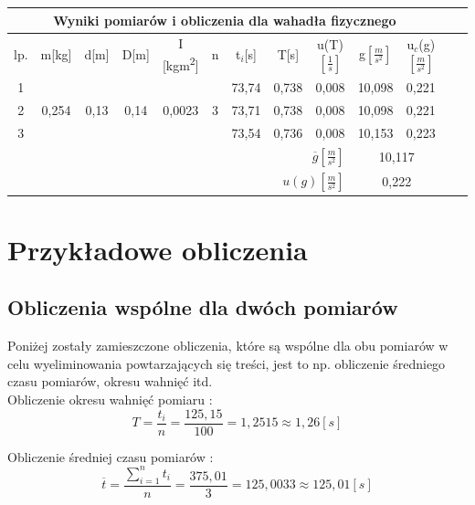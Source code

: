 \documentclass[12pt]{article}
\begin{document}
\begin{table}[!htbp]
    \centering
    \begin{adjustbox}{width=1\textwidth}
    \begin{tabular}{|c|c|c|c|c|c|c|c|c|c|c|c|c|}
    \hline
    \multicolumn{11}{|c|}{Wyniki pomiarów i obliczenia dla wahadła fizycznego} \\
    \hline
    lp. & m[kg] & d[m] & D[m] & I [kgm\textsuperscript{2}] & n & t$_i$[s] & T[s] & u(T)$\left[\frac{1}{s} \right]$ & g$\left[\frac{m}{s^2}\right]$ & u$_c$(g)$\left[ \frac{m}{s^2} \right]$ \\
    \hline
    1 & \multirow{3}{*}{0,254} & \multirow{3}{*}{0,13} & \multirow{3}{*}{0,14} & \multirow{3}{*}{0,0023} & \multirow{3}{*}{3} & 73,74 & 0,738 & 0,008 & 10,098 & 0,221 \\
    \cline{7-11}
    2 &  & ~ & ~ & ~ & ~ & 73,71 & 0,738 & 0,008 & 10,098 & 0,221 \\
    \cline{7-11}
    3 &  & ~ & ~ & ~ & ~ & 73,54 & 0,736 & 0,008 & 10,153 & 0,223 \\ \hline
    \multicolumn{9}{|r|}{$\overline{g}\left[ \frac{m}{s^2} \right]$} & \multicolumn{2}{|c|}{10,117} \\ \hline
    \multicolumn{9}{|r|}{$u(g)\left[ \frac{m}{s^2} \right]$} & \multicolumn{2}{|c|}{0,222} \\ \hline
    \end{tabular}
\end{adjustbox}
\end{table}



\section{Przykładowe obliczenia}

\subsection{Obliczenia wspólne dla dwóch pomiarów}

Poniżej zostały zamieszczone obliczenia, które są wspólne dla obu pomiarów w celu wyeliminowania powtarzających się treści, jest to np.
obliczenie średniego czasu pomiarów, okresu wahnięć itd. \\

Obliczenie okresu wahnięć pomiaru :
$$ T = \frac{t_i}{n} = \frac{125,15}{100} = 1,2515 \approx 1,26[s] $$

Obliczenie średniej czasu pomiarów : 
$$ \overline{t} = \frac{\sum\limits_{i=1}^{n} t_i}{n} = \frac{375,01}{3} = 125,0033 \approx 125,01[s] $$
\end{document}
